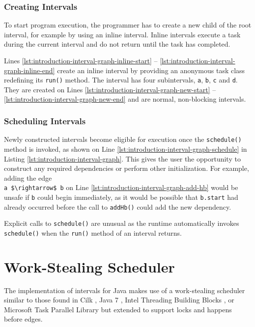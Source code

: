 \subsubsection{Creating Intervals}
\label{sec:intro-intervals-creating-intervals}

To start program execution, the programmer has to create a new child
of the root interval, for example by using an inline interval. Inline
intervals execute a task during the current interval and do not return
until the task has completed.

Lines \ref{lst:introduction-interval-graph-inline-start} --
\ref{lst:introduction-interval-graph-inline-end} create an inline interval by
providing an anonymous task class redefining its \lstinline!run()!
method. The interval has four subintervals, \lstinline!a!,
\lstinline!b!, \lstinline!c! and \lstinline!d!. They are created on
Lines \ref{lst:introduction-interval-graph-new-start} --
\ref{lst:introduction-interval-graph-new-end} and are normal, non-blocking
intervals.

\subsubsection{Scheduling Intervals}
\label{sec:intro-intervals-scheduling-intervals}

Newly constructed intervals become eligible for execution once the
\lstinline!schedule()! method is invoked, as shown on Line
\ref{lst:introduction-interval-graph-schedule} in Listing
\ref{lst:introduction-interval-graph}. This gives the user the
opportunity to construct any required dependencies or perform other
initialization. For example, adding the edge \\
\lstinline!a $\rightarrow$ b! on Line
\ref{lst:introduction-interval-graph-add-hb} would be unsafe if
\lstinline!b! could begin immediately, as it would be possible that
\lstinline!b.start! had already occurred before the call to
\lstinline!addHb()! could add the new dependency.

Explicit calls to \lstinline!schedule()! are unusual as the runtime
automatically invokes \lstinline!schedule()! when the
\lstinline!run()! method of an interval returns.


\section{Work-Stealing Scheduler}
\label{sec:intro-work-stealing-scheduler}

The implementation of intervals for Java makes use of a work-stealing
scheduler similar to those found in Cilk \cite{Blumofe1995,
  Frigo1998}, Java 7 \cite{Lea2000, Lea2000a, Lea2004, Lea2006}, Intel
Threading Building Blocks \cite{Reinders2007, Contreras2008}, or
Microsoft Task Parallel Library \cite{Leijen2009} but extended to
support locks and happens before edges.

